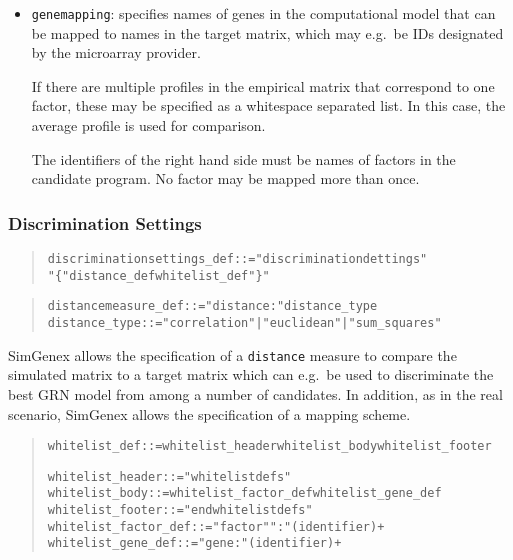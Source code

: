 \documentclass[a4paper,fleqn]{article}
\newcommand{\computercode}[1]{\texttt{#1}}
\newenvironment{ebnfrule}{\begin{footnotesize}\begin{quote}\begin{alltt}}{\end{alltt}\end{quote}\end{footnotesize}}
\begin{document}
\begin{itemize}
\item \computercode{genemapping}: specifies names of genes in the computational 
model that can be mapped to names in the target matrix, which may e.g.\ be IDs 
designated by the microarray provider. 

If there are multiple profiles in the empirical matrix that correspond to
one factor, these may be specified as a whitespace separated list. In
this case, the average profile is used for comparison.

The identifiers of the right hand side must be names of factors in the
candidate program. No factor may be mapped more than once.
\end{itemize}



\subsubsection{Discrimination Settings}

\begin{ebnfrule}
  discriminationsettings_def ::= "discriminationdettings" 
  "\{"  distance_def whitelist_def "\}"
\end{ebnfrule}

\begin{ebnfrule}
distancemeasure_def ::= "distance:" distance_type 
distance_type ::= "correlation" | "euclidean" | "sum_squares" 
\end{ebnfrule}

SimGenex allows the specification of a \computercode{distance} measure
to compare the simulated matrix to a target matrix which can e.g.\ be
used to discriminate the best GRN model from among a number of
candidates. In addition, as in the real scenario, SimGenex allows the
specification of a mapping scheme.


\begin{ebnfrule}
whitelist_def ::= whitelist_header whitelist_body whitelist_footer

whitelist_header ::= "whitelistdefs" 
whitelist_body ::= whitelist_factor_def whitelist_gene_def
whitelist_footer ::= "endwhitelistdefs" 
whitelist_factor_def ::= "factor" ":" (identifier)+
whitelist_gene_def ::= "gene: " (identifier)+ 
\end{ebnfrule}

\end{document}
